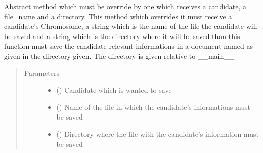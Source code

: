 \documentclass[letterpaper,10pt,english]{sphinxmanual}
\begin{document}
\begin{fulllineitems}
\begin{fulllineitems}
\label{\detokenize{MolOpt.genetic:MolOpt.genetic.genetic.Genetic.save}}
\sphinxAtStartPar
Abstract method which must be override by one which receives a candidate, a file\_name and a directory. This 
method which overrides it must receive a candidate’s Chromosome, a string which is the name of the file the 
candidate will be saved and a string which is the directory where it will be saved than this function must save 
the candidate relevant informations in a document named as given in the directory given. The directory is given 
relative to \_\_main\_\_
\begin{quote}\begin{description}
\item[{Parameters}] \leavevmode\begin{itemize}
\item {} 
\sphinxAtStartPar
{} ({\hyperref[\detokenize{MolOpt.genetic:MolOpt.genetic.genetic.Chromosome}]{}}) \textendash{} Candidate which is wanted to save

\item {} 
\sphinxAtStartPar
{} () \textendash{} Name of the file in which the candidate’s informations must be saved

\item {} 
\sphinxAtStartPar
{} () \textendash{} Directory where the file with the candidate’s information must be saved

\end{itemize}

\end{description}\end{quote}

\end{fulllineitems}


\end{fulllineitems}
\end{document}
